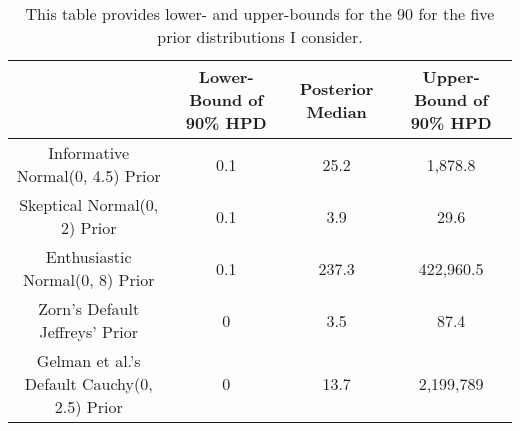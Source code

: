 \begin{table}[H]
\centering
{\scriptsize
\begin{tabular}{|cccc|}
  \hline
 & Lower-Bound of 90\% HPD & Posterior Median & Upper-Bound of 90\% HPD \\ 
  \hline
Informative Normal(0, 4.5) Prior &       0.1 &      25.2 &   1,878.8 \\ 
  Skeptical Normal(0, 2) Prior &       0.1 &       3.9 &      29.6 \\ 
  Enthusiastic Normal(0, 8) Prior &       0.1 &     237.3 & 422,960.5 \\ 
  Zorn's Default Jeffreys' Prior &         0 &       3.5 &      87.4 \\ 
  Gelman et al.'s Default Cauchy(0, 2.5) Prior &         0 &      13.7 & 2,199,789 \\ 
   \hline
\end{tabular}
}
\caption{This table provides lower- and upper-bounds for the 90%
              for the five prior distributions I consider.} 
\label{tab:bm-pppd-deciles}
\end{table}
